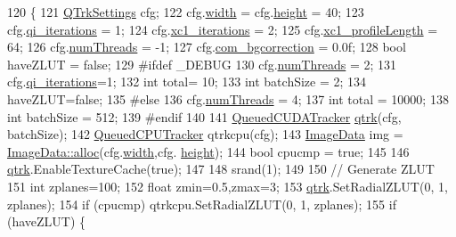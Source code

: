 \begin{DoxyCode}
120 \{
121     \hyperlink{struct_q_trk_settings}{QTrkSettings} cfg;
122     cfg.\hyperlink{struct_q_trk_settings_aef24eb3a4692bd67ff1aca8ef950e08d}{width} = cfg.\hyperlink{struct_q_trk_settings_a94c965d103e7a0a4f1fced8eee1324ce}{height} = 40;
123     cfg.\hyperlink{struct_q_trk_settings_a12105babb328a9a7ec90f0eab074fabb}{qi\_iterations} = 1;
124     cfg.\hyperlink{struct_q_trk_settings_a0bc4efdffbb8ad272d1c9facfdf0e171}{xc1\_iterations} = 2;
125     cfg.\hyperlink{struct_q_trk_settings_a8f38457c4ec183f78a0191b247ab6b51}{xc1\_profileLength} = 64;
126     cfg.\hyperlink{struct_q_trk_settings_a8c6f1c671b527155afd5dad894c152da}{numThreads} = -1;
127     cfg.\hyperlink{struct_q_trk_settings_a18ce353ffb049d1c86254a773a6fe49d}{com\_bgcorrection} = 0.0f;
128     \textcolor{keywordtype}{bool} haveZLUT = \textcolor{keyword}{false};
129 \textcolor{preprocessor}{#ifdef \_DEBUG}
130     cfg.\hyperlink{struct_q_trk_settings_a8c6f1c671b527155afd5dad894c152da}{numThreads} = 2;
131     cfg.\hyperlink{struct_q_trk_settings_a12105babb328a9a7ec90f0eab074fabb}{qi\_iterations}=1;
132     \textcolor{keywordtype}{int} total= 10;
133     \textcolor{keywordtype}{int} batchSize = 2;
134     haveZLUT=\textcolor{keyword}{false};
135 \textcolor{preprocessor}{#else}
136     cfg.\hyperlink{struct_q_trk_settings_a8c6f1c671b527155afd5dad894c152da}{numThreads} = 4;
137     \textcolor{keywordtype}{int} total = 10000;
138     \textcolor{keywordtype}{int} batchSize = 512;
139 \textcolor{preprocessor}{#endif}
140 
141     \hyperlink{class_queued_c_u_d_a_tracker}{QueuedCUDATracker} \hyperlink{namespaceqtrk}{qtrk}(cfg, batchSize);
142     \hyperlink{class_queued_c_p_u_tracker}{QueuedCPUTracker} qtrkcpu(cfg);
143     \hyperlink{struct_t_image_data}{ImageData} img = \hyperlink{struct_t_image_data_a8ae528964e70c0d0a98b8481cc8b083e}{ImageData::alloc}(cfg.\hyperlink{struct_q_trk_settings_aef24eb3a4692bd67ff1aca8ef950e08d}{width},cfg.
      \hyperlink{struct_q_trk_settings_a94c965d103e7a0a4f1fced8eee1324ce}{height});
144     \textcolor{keywordtype}{bool} cpucmp = \textcolor{keyword}{true};
145 
146     \hyperlink{namespaceqtrk}{qtrk}.EnableTextureCache(\textcolor{keyword}{true});
147 
148     srand(1);
149 
150     \textcolor{comment}{// Generate ZLUT}
151     \textcolor{keywordtype}{int} zplanes=100;
152     \textcolor{keywordtype}{float} zmin=0.5,zmax=3;
153     \hyperlink{namespaceqtrk}{qtrk}.SetRadialZLUT(0, 1, zplanes);
154     \textcolor{keywordflow}{if} (cpucmp) qtrkcpu.SetRadialZLUT(0, 1, zplanes);
155     \textcolor{keywordflow}{if} (haveZLUT) \{

\end{DoxyCode}
